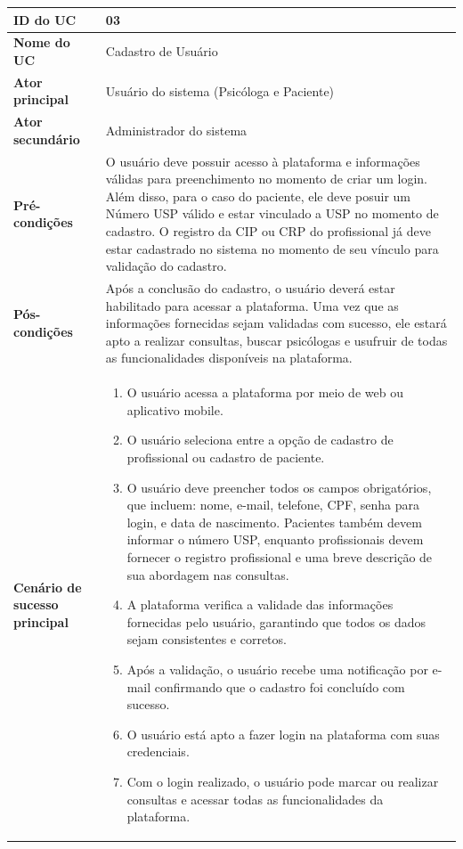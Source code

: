 \documentclass[a4paper,12pt]{report}
\begin{document}
\begin{longtable}{|p{4cm}|p{11.5cm}|}
    \hline
    \textbf{ID do UC} & \textbf{03} \\ \hline
    \textbf{Nome do UC} & Cadastro de Usuário\\ \hline
    \textbf{Ator principal} & Usuário do sistema (Psicóloga e Paciente) \\ \hline
    \textbf{Ator secundário} & Administrador do sistema \\ \hline
    \textbf{Pré-condições} & O usuário deve possuir acesso à plataforma e informações válidas para preenchimento no momento de criar um login. Além disso, para o caso do paciente, ele deve posuir um Número USP válido e estar vinculado a USP no momento de cadastro.
    O registro da CIP ou CRP do profissional já deve estar cadastrado no sistema no momento de seu vínculo para validação do cadastro.\\ \hline
    \textbf{Pós-condições} & Após a conclusão do cadastro, o usuário deverá estar habilitado para acessar a plataforma. Uma vez que as informações fornecidas sejam validadas com sucesso, ele estará apto a realizar consultas, buscar psicólogas e usufruir de todas as funcionalidades disponíveis na plataforma. \\ \hline
    \textbf{Cenário de sucesso principal} & 
    \begin{enumerate}[leftmargin=*,labelsep=1em]
        \item O usuário acessa a plataforma por meio de web ou aplicativo mobile.
        \item O usuário seleciona entre a opção de cadastro de profissional ou cadastro de paciente.
        \item O usuário deve preencher todos os campos obrigatórios, que incluem: nome, e-mail, telefone, CPF, senha para login, e data de nascimento. Pacientes também devem informar o número USP, enquanto profissionais devem fornecer o registro profissional e uma breve descrição de sua abordagem nas consultas.
        \item A plataforma verifica a validade das informações fornecidas pelo usuário, garantindo que todos os dados sejam consistentes e corretos.
        \item Após a validação, o usuário recebe uma notificação por e-mail confirmando que o cadastro foi concluído com sucesso.
        \item O usuário está apto a fazer login na plataforma com suas credenciais.
        \item Com o login realizado, o usuário pode marcar ou realizar consultas e acessar todas as funcionalidades da plataforma.

\end{enumerate}
\end{longtable}
\end{document}
